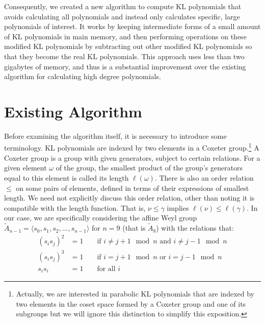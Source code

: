 \documentclass[12pt]{article} %
\begin{document}
Consequently, we created a new algorithm to compute KL polynomials that avoids calculating all polynomials and instead only calculates specific, large polynomials of interest. It works by keeping  intermediate forms of a small amount of KL polynomials in main memory, and then performing operations on these modified KL polynomials by subtracting out other modified KL polynomials so that they become the real KL polynomials. This approach uses less than two gigabytes of memory, and thus is a substantial improvement over the existing algorithm for calculating high degree polynomials.

\section{Existing Algorithm}

Before examining the algorithm itself, it is necessary to introduce some terminology. KL polynomials are indexed by two elements in a Coxeter group.\footnote{Actually, we are interested in parabolic KL polynomials that are indexed by two elements in the coset space formed by a Coxeter group and one of its subgroups \citep{deodhar87} but we will ignore this distinction to simplify this exposition.} A Coxeter group is a group with given generators, subject to certain relations. For a given element $\omega$ of the group, the smallest product of the group's generators equal to this element is called its length $\ell(\omega)$. There is also an order relation $\leq$ on some pairs of elements,  defined in terms of their expressions of smallest length. We need not explicitly discuss this order relation, other than noting it is compatible with the length function. That is, $\nu \leq \gamma$ implies $\ell(\nu) \leq \ell(\gamma)$. In our case, we are specifically considering the affine Weyl group $\tilde A_{n-1} = \langle s_0,s_1,s_2,...,s_{n-1} \rangle$ for $n=9$ (that is $\tilde A_8$) with the relations that: 
\begin{align*}
(s_is_j)^2 &= 1&&\text{ if } i\not = j +1\mod n\text{ and }i \not = j -1 \mod n \\
(s_is_j)^3 &= 1  &&\text{ if } i= j +1\mod n \text{ or } i  = j -1 \mod n\\
s_is_i &= 1 && \text{ for all } i
\end{align*}

\end{document}
